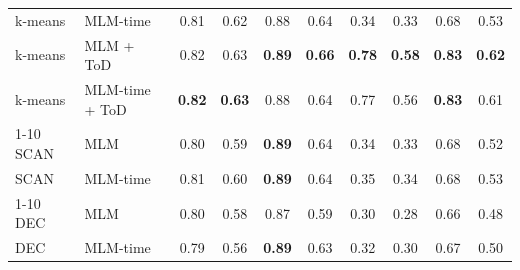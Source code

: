 \begin{table}[t]
\begin{tabular}{llcccccc|cc}
k-means & MLM-time & 0.81 & 0.62 & 0.88 & 0.64 & 0.34 & 0.33 & 0.68 & 0.53 \\
k-means & MLM + ToD & 0.82 & 0.63 & \textbf{0.89} & \textbf{0.66} & \textbf{0.78} & \textbf{0.58} & \textbf{0.83} & \textbf{0.62} \\
k-means & MLM-time + ToD & \textbf{0.82} & \textbf{0.63} & 0.88 & 0.64 & 0.77 & 0.56 & \textbf{0.83} & 0.61 \\
\cmidrule{1-10}
SCAN & MLM & 0.80 & 0.59 & \textbf{0.89} & 0.64 & 0.34 & 0.33 & 0.68 & 0.52 \\
SCAN & MLM-time & 0.81 & 0.60 & \textbf{0.89} & 0.64 & 0.35 & 0.34 & 0.68 & 0.53 \\
\cmidrule{1-10}
DEC & MLM & 0.80 & 0.58 & 0.87 & 0.59 & 0.30 & 0.28 & 0.66 & 0.48 \\
DEC & MLM-time & 0.79 & 0.56 & \textbf{0.89} & 0.63 & 0.32 & 0.30 & 0.67 & 0.50 \\
\bottomrule
\end{tabular}
\end{table}
